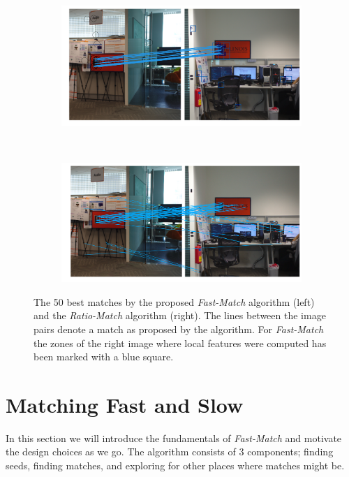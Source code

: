 \documentclass[runningheads]{llncs}
\begin{document}
\begin{figure}[tb]
    \centering
    \begin{subfigure}[t]{0.5\columnwidth}
        \includegraphics[width=1\columnwidth]{images/Illinois-fastmatch}
    \end{subfigure}%
    ~%
    \begin{subfigure}[t]{0.5\columnwidth}
        \includegraphics[width=1\columnwidth]{images/Illinois-ratiomatch}
    \end{subfigure}%
    \caption{The 50 best matches by the proposed \emph{Fast-Match} algorithm (left) and the \emph{Ratio-Match} algorithm \cite{lowe2004sift} (right). The lines between the image pairs denote a match as proposed by the algorithm. For \emph{Fast-Match} the zones of the right image where local features were computed has been marked with a blue square.}
    \label{fig:match_example}
\end{figure}

\section{Matching Fast and Slow}
\label{algorithm}
%
In this section we will introduce the fundamentals of \emph{Fast-Match} and motivate the design choices as we go. The algorithm consists of 3 components; finding seeds, finding matches, and exploring for other places where matches might be.
\end{document}
